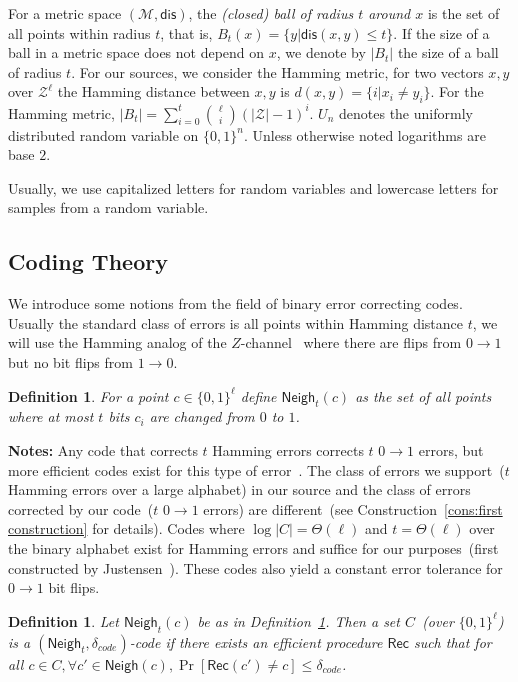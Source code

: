 \documentclass[11pt]{article}
\newcommand{\secref}[1]{\mbox{Section~\ref{#1}}}
\newcommand{\defref}[1]{\mbox{Definition~\ref{#1}}}
\newcommand{\consref}[1]{\mbox{Construction~\ref{#1}}}
\newcommand{\class}[1]{{\ensuremath{\mathsf{#1}}}}
\newcommand{\rec}{\ensuremath{\class{Rec}}\xspace}
\newcommand{\zo}{\ensuremath{\{0, 1\}}}
\newcommand{\neigh}{\ensuremath{\class{Neigh}}\xspace}
\newcommand{\dis}{\ensuremath{\mathsf{dis}}}
\newtheorem{definition}[theorem]{Definition}
\newcommand{\authnote}[2]{{\textcolor{red}{\textsf{#1 notes: }\textcolor{blue}{ #2}}\marginpar{\textcolor{red}{\textbf{!!!!!}}}}}
\newcommand{\authnote}[2]{}
\newcommand{\bnote}[1]{{\authnote{Ben}{#1}}}
\begin{document}
For a metric space $(\mathcal{M}, \dis)$, the \emph{(closed) ball of radius $t$ around $x$} is the set of all points within radius $t$, that is, $B_t(x) = \{y| \dis(x, y)\leq t\}$.  If the size of a ball in a metric space does not depend on $x$, we denote by $|B_t|$ the size of a ball of radius $t$.  For our sources, we consider the Hamming metric, for two vectors $x, y$ over $\mathcal{Z}^\ell$ the Hamming distance between $x,y$ is $d(x,y) = \{i | x_i \neq y_i\}$.  For the Hamming metric, $|B_t| = \sum_{i=0}^t {\ell \choose i} (|\mathcal{Z}|-1)^i $.  $U_n$ denotes the uniformly  distributed random variable on $\{0,1\}^n$.  Unless otherwise noted logarithms are base $2$.


Usually, we use capitalized letters for random variables and lowercase letters for samples from a random variable.

\subsection{Coding Theory}
\label{sec:coding theory}
We introduce some notions from the field of binary error correcting codes.  Usually the standard class of errors  is all points within Hamming distance $t$, we will use the Hamming analog of the $Z$-channel~\cite{tallini2002capacity} where there are flips from $0\rightarrow 1$ but no bit flips from $1\rightarrow 0$.
\begin{definition}
\label{def:hamming z channel}
For a point $c\in \zo^\ell$ define $\neigh_t(c) $ as the set of all points where at most $t$ bits $c_i$ are changed from $0$ to $1$.
\end{definition}
\textbf{Notes:} Any code that corrects $t$ Hamming errors corrects $t$ $0\rightarrow 1$ errors, but more efficient codes  exist for this type of error~\cite{tallini2002capacity}.
The class of errors we support~($t$ Hamming errors over a large alphabet) in our source and the class of errors corrected by our code~($t$ $0\rightarrow 1$ errors) are different~(see \consref{cons:first construction} for details).  Codes where $\log |C| = \Theta(\ell)$ and $t = \Theta(\ell)$ over the binary alphabet exist for Hamming errors and suffice for our purposes~(first constructed by Justensen~\cite{justesen1972class}).  These codes also yield a constant error tolerance for $0\rightarrow 1$ bit flips.

\begin{definition}
Let $\neigh_t(c)$ be as in \defref{def:hamming z channel}.  Then a set $C$~(over $\zo^\ell$) is a $(\neigh_t, \delta_{code})$-code if there exists an efficient procedure $\rec$ such that for all $c\in C, \forall c'\in \neigh(c), \Pr[\rec(c') \neq c] \leq \delta_{code}$.
\end{definition}
\end{document}
